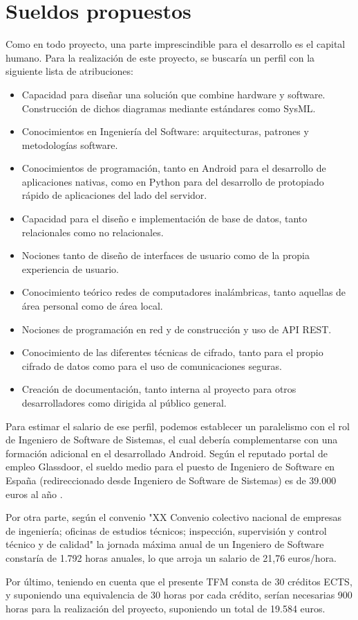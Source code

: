 \section{Sueldos propuestos}

Como en todo proyecto, una parte imprescindible para el desarrollo es el capital humano. Para la realización de este proyecto, se buscaría un perfil con la siguiente lista de atribuciones:

\begin{itemize}
    \item Capacidad para diseñar una solución que combine hardware y software. Construcción de dichos diagramas mediante estándares como SysML.
    \item Conocimientos en Ingeniería del Software: arquitecturas, patrones y metodologías software.
    \item Conocimientos de programación, tanto en Android para el desarrollo de aplicaciones nativas, como en Python para del desarrollo de protopiado rápido de aplicaciones del lado del servidor.
    \item Capacidad para el diseño e implementación de base de datos, tanto relacionales como no relacionales.
    \item Nociones tanto de diseño de interfaces de usuario como de la propia experiencia de usuario.
    \item Conocimiento teórico redes de computadores inalámbricas, tanto aquellas de área personal como de área local. 
    \item Nociones de programación en red y de construcción y uso de API REST.
    \item Conocimiento de las diferentes técnicas de cifrado, tanto para el propio cifrado de datos como para el uso de comunicaciones seguras.
    \item Creación de documentación, tanto interna al proyecto para otros desarrolladores como dirigida al público general.
\end{itemize}

Para estimar el salario de ese perfil, podemos establecer un paralelismo con el rol de Ingeniero de Software de Sistemas, el cual debería complementarse con una formación adicional en el desarrollado Android. Según el reputado portal de empleo Glassdoor, el sueldo medio para el puesto de Ingeniero de Software en España (redireccionado desde Ingeniero de Software de Sistemas) es de 39.000 euros al año \cite{noauthor_sueldo_nodate}.

Por otra parte, según el convenio "XX Convenio colectivo nacional de empresas de ingeniería; oficinas de estudios técnicos; inspección, supervisión y control técnico y de calidad" \cite{ministerio_de_trabajo_y_economia_social_resolucion_2023} la jornada máxima anual de un Ingeniero de Software constaría de 1.792 horas anuales, lo que arroja un salario de 21,76 euros/hora.

Por último, teniendo en cuenta que el presente TFM consta de 30 créditos ECTS, y suponiendo una equivalencia de 30 horas por cada crédito, serían necesarias 900 horas para la realización del proyecto, suponiendo un total de 19.584 euros.
